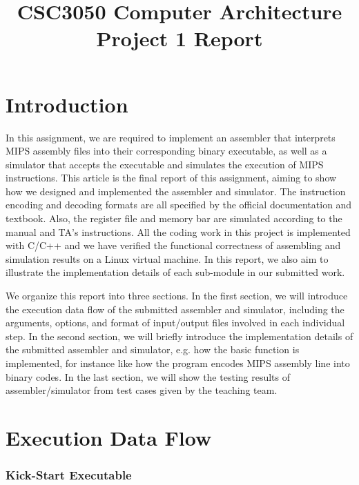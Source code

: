\documentclass[conference, draftclsnofoot, letterpaper]{IEEETran}
\begin{document}
\title{CSC3050 Computer Architecture \\Project 1 Report}

\author{
}


\maketitle


\section{Introduction}

In this assignment, we are required to implement an assembler that interprets MIPS assembly files into their corresponding binary executable, as well as a simulator that accepts the executable and simulates the execution of MIPS instructions. This article is the final report of this assignment, aiming to show how we designed and implemented the assembler and simulator. The instruction encoding and decoding formats are all specified by the official documentation and textbook. Also, the register file and memory bar are simulated according to the manual and TA's instructions. All the coding work in this project is implemented with C/C++ and we have verified the functional correctness of assembling and simulation results on a Linux virtual machine. In this report, we also aim to illustrate the implementation details of each sub-module in our submitted work. 

We organize this report into three sections. In the first section, we will introduce the execution data flow of the submitted assembler and simulator, including the arguments, options, and format of input/output files involved in each individual step. In the second section, we will briefly introduce the implementation details of the submitted assembler and simulator, e.g. how the basic function is implemented, for instance like how the program encodes MIPS assembly line into binary codes. In the last section, we will show the testing results of assembler/simulator from test cases given by the teaching team. 


\section{Execution Data Flow} 

\subsubsection{Kick-Start Executable}
\end{document}
